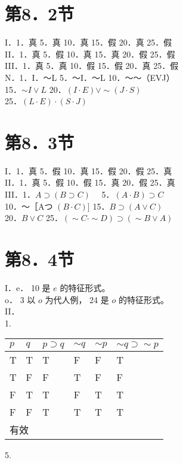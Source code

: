 \section*{第8．2节}
I．1．真 5．真 10．真 15．假 20．真 25．假\\
II．1．真 5．假 10．真 15．真 20．假 25．假\\
III．1．真 5．真 10．假 15．假 20．真 25．假\\
N．1．I．～L 5．～I．～L 10．～～（EVJ）\\
15．$\sim I \vee L$ 20．$(I \cdot E) \vee \sim(J \cdot S)$\\
25．$(L \cdot E) \cdot(S \cdot J)$

\section*{第8．3节}
I．1．真 5．假 10．真 15．假 20．假 25．真\\
II．1．真 5．假 10．假 15．真 20．假 25．真\\
III．1．$A \supset(B \supset C) \quad$ 5．$(A \cdot B) \supset C$\\
10．～［Aつ $(B \cdot C)]$ 15．$B \supset(A \vee C)$\\
20．$B \vee C$ 25．$(\sim C \cdot \sim D) \supset(\sim B \vee A)$

\section*{第8．4节}
I．e． 10 是 $e$ 的特征形式。\\
o． 3 以 $o$ 为代人例， 24 是 $o$ 的特征形式。\\
II．\\
1.

\begin{center}
\begin{tabular}{|l|l|l|l|l|l|}
\hline
$p$ & $q$ & $p \supset q$ & $\sim q$ & $\sim p$ & $\sim q \supset \sim p$ \\
\hline
T & T & T & F & F & T \\
\hline
T & F & F & T & F & F \\
\hline
F & T & T & F & T & T \\
\hline
F & F & T & T & T & T \\
\hline
\multicolumn{6}{|l|}{有效} \\
\hline
\end{tabular}
\end{center}

5.

